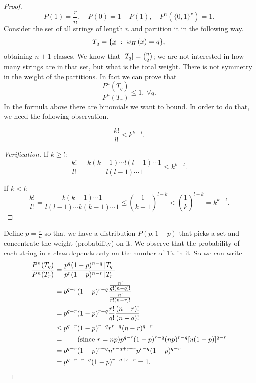 \begin{proof}
	\begin{equation*}
		P(1) = \frac{r}{n},\quad P(0) = 1 - P(1),\quad P^n(\{0, 1\}^n) = 1.
	\end{equation*}
	Consider the set of all strings of length $n$ and partition it in the following way.
	\begin{equation*}
		T_q = \{\underline{x}\ :\ w_H\left(x\right) = q\},
	\end{equation*}
	obtaining $n +1$ classes. 
	We know that $\left|{T_q}\right| = \binom{n}{q}$; we are not interested in how many strings are in that set, but what is the total weight.
	There is not symmetry in the weight of the partitions.
	In fact we can prove that
	\begin{equation*}
		\frac{P^n(T_q)}{P^n(T_r)} \le 1,\ \forall q.
	\end{equation*}
	In the formula above there are binomials we want to bound.
	In order to do that, we need the following observation.

	\begin{obs}
		\begin{equation*}
			\frac{k!}{l!} \le k^{k-l}.
		\end{equation*}
	\end{obs}

	\begin{proof}[Verification]
		If $k \ge l$:
			\begin{equation*}
				\frac{k!}{l!} = \frac{k(k-1) \cdots l(l -1) \cdots 1}{l(l -1) \cdots 1} \le k^{k-l}.
			\end{equation*}

		If $k < l$:
			\begin{equation*}
				\frac{k!}{l!} = \frac{k(k-1) \cdots 1}{l(l -1) \cdots k(k-1) \cdots 1} \le \left(\frac{1}{k+1}\right)^{l-k} < \left(\frac{1}{k}\right)^{l-k} = k^{k-l}.
			\end{equation*}
	\end{proof}

	Define $p = \frac{r}{n}$  so that we have a distribution $P(p, 1-p)$ that picks a set and concentrate the weight (probability) on it.
	We observe that the probability of each string in a class depends only on the number of $1$'s in it.
	So we can write
	\begin{align*}
		\frac{P^n(T_q)}{P^n(T_r)}
		& =
		\frac{p^q(1-p)^{n-q}\left|{T_q}\right|}{p^r(1-p)^{n-r}\left|{T_r}\right|}
		\\
		& =
		p^{q-r}(1-p)^{r-q} \frac{\frac{n!}{q!(n-q)!}}{\frac{n!}{r!(n-r)!}}
		\\
		& =
		p^{q-r}(1-p)^{r-q}\frac{r!}{q!}\frac{(n-r)!}{(n-q)!}
		\\
		& \le
		p^{q-r}(1-p)^{r-q}r^{r-q}(n-r)^{q-r}
		\\
		& =
		\tag{since $r = np$}
		p^{q-r}(1-p)^{r-q} (np)^{r-q}[n(1-p)]^{q-r}
		\\
		& =
		p^{q-r}(1-p)^{r-q}n^{r-q+q-r}p^{r-q}(1-p)^{q-r}
		\\
		& =
		p^{q-r + r-q}(1-p)^{r-q+q-r}
		=
		1.
	\end{align*}


\end{proof}
